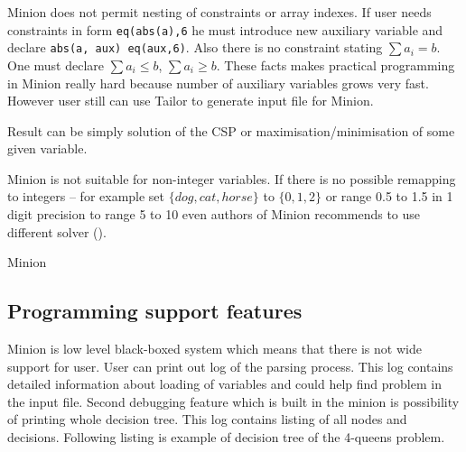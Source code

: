 Minion does not permit nesting of constraints or array indexes. If user 
needs constraints in form \verb=eq(abs(a),6= he must introduce new auxiliary
variable and declare \verb=abs(a, aux) eq(aux,6)=. Also there is no constraint
stating $\sum{a_i} = b$. One must declare $\sum{a_i} \leq b$, $\sum{a_i} \geq b$.
These facts makes practical programming in Minion really hard because 
number of auxiliary variables grows very fast. However user still can 
use Tailor to generate input file for Minion.

Result can be simply solution of the CSP or maximisation/minimisation of
some given variable. 

Minion is not suitable for non-integer variables. If 
there is no possible remapping to integers -- for example set $\{dog, cat, 
horse\}$ to $\{0,1,2\}$ or range 0.5 to 1.5 in 1 digit precision to range
5 to 10 even authors of Minion recommends to use different solver (\cite{minion-sf-gentian}).

Minion 

  

\subsection{Programming support features}

Minion is low level black-boxed system which means that there is 
not wide support for user. User can print out log of the 
parsing process. This log contains detailed information about loading 
of variables and could help find problem in the input file. Second 
debugging feature which is built in the minion is possibility of 
printing whole decision tree. This log contains listing of all nodes 
and decisions. Following listing is example of decision tree of 
the 4-queens problem.

